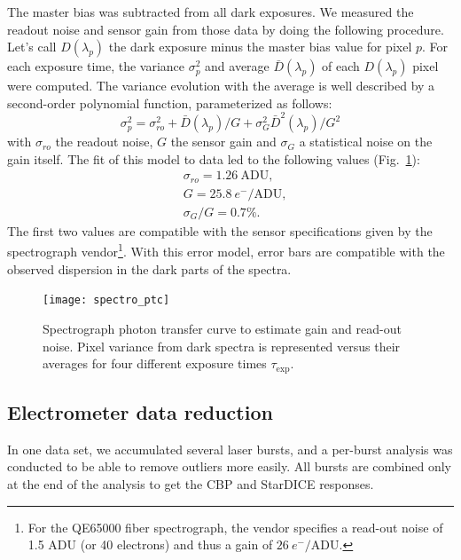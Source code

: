 The master bias was subtracted from all dark exposures. We measured the readout noise and sensor gain from those data by doing the following procedure. Let's call $D(\lambda_p)$ the dark exposure minus the master bias value for pixel $p$. For each exposure time, the variance $\sigma_p^2$ and average $\bar{D}(\lambda_p)$ of each $D(\lambda_p)$ pixel were computed. The variance evolution with the average is well described by a second-order polynomial function, parameterized as follows:
\begin{equation}\label{eq:spectro_error_model}
\sigma^2_p =\sigma_{ro}^2 +  \bar{D}(\lambda_p)/G + \sigma_G^2 \bar{D}^2(\lambda_p)/G^2
\end{equation}
with $\sigma_{ro}$ the readout noise, $G$ the sensor gain and $\sigma_G$ a statistical noise on the gain itself. The fit of this model to data led to the following values (Fig.~\ref{fig:spectro_ptc}):
\begin{align}
    & \sigma_{ro} = 1.26\ \mathrm{ADU}, \\
    & G = 25.8\ e^-/\mathrm{ADU} ,\\
    & \sigma_G/G = 0.7\%.
\end{align}
The first two values are compatible with the sensor specifications given by the spectrograph vendor\footnote{For the QE65000 fiber spectrograph, the vendor specifies a read-out noise of 1.5 ADU (or 40 electrons) and thus a gain of $26\ e^-/\mathrm{ADU}$.}. 
With this error model, error bars are compatible with the observed dispersion in the dark parts of the spectra. 

\begin{figure}%
\centering
\texttt{[image: spectro\_ptc]}
\caption{Spectrograph photon transfer curve to estimate gain and read-out noise. Pixel variance from dark spectra is represented versus their averages for four different exposure times $\tau_{\mathrm{exp}}$.}\label{fig:spectro_ptc}
\end{figure}





\subsection{Electrometer data reduction}

In one data set, we accumulated several laser bursts, and a per-burst analysis was conducted to be able to remove outliers more easily. All bursts are combined only at the end of the analysis to get the CBP and StarDICE responses.


